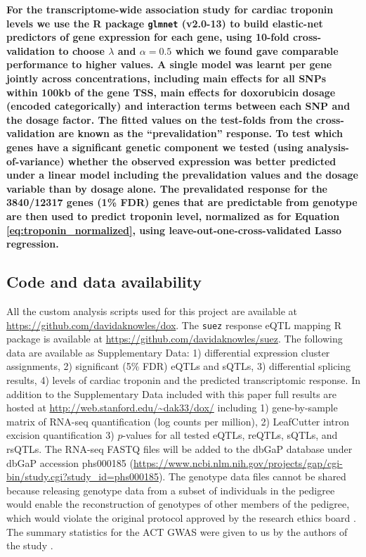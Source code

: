 \documentclass{article}
\newcommand{\tempbold}[1]{\textbf{#1}}
\begin{document}
\tempbold{For the transcriptome-wide association study for cardiac troponin levels we use the R package \texttt{glmnet} (v2.0-13) to build elastic-net predictors of gene expression for each gene, using 10-fold cross-validation to choose $\lambda$ and $\alpha=0.5$ which we found gave comparable performance to higher values. A single model was learnt per gene jointly across concentrations, including main effects for all SNPs within 100kb of the gene TSS, main effects for doxorubicin dosage (encoded categorically) and interaction terms between each SNP and the dosage factor. The fitted values on the test-folds from the cross-validation are known as the ``prevalidation'' response. To test which genes have a significant genetic component we tested (using analysis-of-variance) whether the observed expression was better predicted under a linear model including the prevalidation values and the dosage variable than by dosage alone. The prevalidated response for the 3840/12317 genes (1\% FDR) genes that are predictable from genotype are then used to predict troponin level, normalized as for Equation \ref{eq:troponin_normalized}, using leave-out-one-cross-validated Lasso regression.} 

\subsection*{Code and data availability}

All the custom analysis scripts used for this project are available at \url{https://github.com/davidaknowles/dox}. 
The \texttt{suez} response eQTL mapping R package is available at \url{https://github.com/davidaknowles/suez}. 
The following data are available as Supplementary Data: 1) differential expression cluster assignments, 2) significant (5\% FDR) eQTLs and sQTLs, 3) differential splicing results, 4) levels of cardiac troponin and the predicted transcriptomic response. 
In addition to the Supplementary Data included with this paper full results are hosted at \url{http://web.stanford.edu/~dak33/dox/} including 1) gene-by-sample matrix of RNA-seq quantification (log counts per million), 2) LeafCutter intron excision quantification 3) $p$-values for all tested eQTLs, reQTLs, sQTLs, and rsQTLs. 
The RNA-seq FASTQ files will be added to the dbGaP database \cite{Tryka2014} under dbGaP accession phs000185
(\url{https://www.ncbi.nlm.nih.gov/projects/gap/cgi-bin/study.cgi?study_id=phs000185}).
The genotype data files cannot be shared because releasing genotype data
from a subset of individuals in the pedigree would enable the reconstruction of
genotypes of other members of the pedigree, which would violate the original
protocol approved by the research ethics board \cite{Livne2015}. 
The summary statistics for the ACT GWAS were given to us by the authors of the study
\cite{Schneider2016}.
\end{document}
